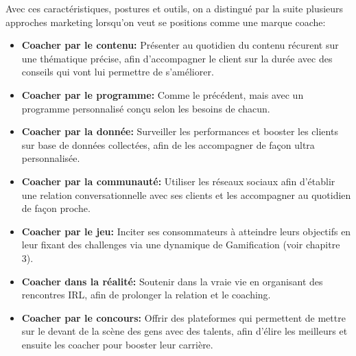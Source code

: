 Avec ces caractéristiques, postures et outils, on a distingué par la suite plusieurs approches marketing lorsqu'on veut se positions comme une marque coache:

\begin{itemize}
    \item \textbf{Coacher par le contenu:} Présenter au quotidien du contenu récurent sur une thématique précise, afin d'accompagner le client sur la durée avec des conseils qui vont lui permettre de s'améliorer.
    \item \textbf{Coacher par le programme:} Comme le précédent, mais avec un programme personnalisé conçu selon les besoins de chacun.
    \item \textbf{Coacher par la donnée:} Surveiller les performances et booster les clients sur base de données collectées, afin de les accompagner de façon ultra personnalisée.
    \item \textbf{Coacher par la communauté:} Utiliser les réseaux sociaux afin d'établir une relation conversationnelle avec ses clients et les accompagner au quotidien de façon proche.
    \item \textbf{Coacher par le jeu:} Inciter ses consommateurs à atteindre leurs objectifs en leur fixant des challenges via une dynamique de Gamification (voir chapitre 3).
    \item \textbf{Coacher dans la réalité:} Soutenir dans la vraie vie en organisant des rencontres IRL, afin de prolonger la relation et le coaching.
    \item \textbf{Coacher par le concours:} Offrir des plateformes qui permettent de mettre sur le devant de la scène des gens avec des talents, afin d'élire les meilleurs et ensuite les coacher pour booster leur carrière.\\
\end{itemize}
